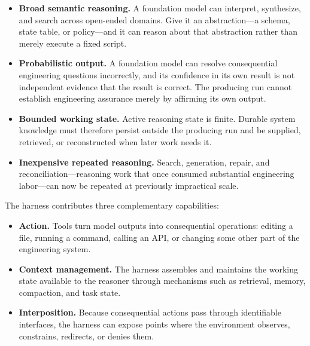\begin{itemize}
\tightlist
\item
  \textbf{Broad semantic reasoning.} A foundation model can interpret, synthesize, and search across open-ended domains. Give it an abstraction---a schema, state table, or policy---and it can reason about that abstraction rather than merely execute a fixed script.
\item
  \textbf{Probabilistic output.} A foundation model can resolve consequential engineering questions incorrectly, and its confidence in its own result is not independent evidence that the result is correct. The producing run cannot establish engineering assurance merely by affirming its own output.
\item
  \textbf{Bounded working state.} Active reasoning state is finite. Durable system knowledge must therefore persist outside the producing run and be supplied, retrieved, or reconstructed when later work needs it.
\item
  \textbf{Inexpensive repeated reasoning.} Search, generation, repair, and reconciliation---reasoning work that once consumed substantial engineering labor---can now be repeated at previously impractical scale.
\end{itemize}


The harness contributes three complementary capabilities:

\begin{itemize}
\tightlist
\item
  \textbf{Action.} Tools turn model outputs into consequential operations: editing a file, running a command, calling an API, or changing some other part of the engineering system.
\item
  \textbf{Context management.} The harness assembles and maintains the working state available to the reasoner through mechanisms such as retrieval, memory, compaction, and task state.
\item
  \textbf{Interposition.} Because consequential actions pass through identifiable interfaces, the harness can expose points where the environment observes, constrains, redirects, or denies them.
\end{itemize}

